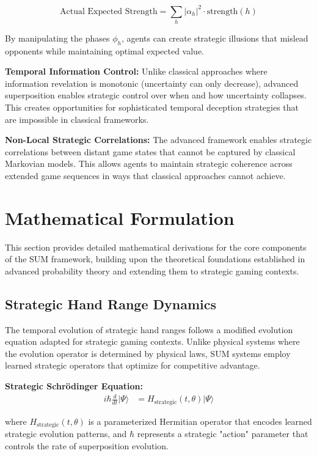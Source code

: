 \documentclass[11pt,a4paper]{article}
\begin{document}
\begin{equation}
\text{Actual Expected Strength} = \sum_{h} |\alpha_h|^2 \cdot \text{strength}(h)
\end{equation}

By manipulating the phases $\phi_h$, agents can create strategic illusions that mislead opponents while maintaining optimal expected value.

\textbf{Temporal Information Control:} Unlike classical approaches where information revelation is monotonic (uncertainty can only decrease), advanced superposition enables strategic control over when and how uncertainty collapses. This creates opportunities for sophisticated temporal deception strategies that are impossible in classical frameworks.

\textbf{Non-Local Strategic Correlations:} The advanced framework enables strategic correlations between distant game states that cannot be captured by classical Markovian models. This allows agents to maintain strategic coherence across extended game sequences in ways that classical approaches cannot achieve.

\section{Mathematical Formulation}

This section provides detailed mathematical derivations for the core components of the SUM framework, building upon the theoretical foundations established in advanced probability theory and extending them to strategic gaming contexts.

\subsection{Strategic Hand Range Dynamics}

The temporal evolution of strategic hand ranges follows a modified evolution equation adapted for strategic gaming contexts. Unlike physical systems where the evolution operator is determined by physical laws, SUM systems employ learned strategic operators that optimize for competitive advantage.

\textbf{Strategic Schrödinger Equation:}
\begin{align}
i\hbar \frac{d}{dt}|\Psi\rangle &= H_{\text{strategic}}(t, \theta) |\Psi\rangle
\end{align}

where $H_{\text{strategic}}(t, \theta)$ is a parameterized Hermitian operator that encodes learned strategic evolution patterns, and $\hbar$ represents a strategic "action" parameter that controls the rate of superposition evolution.
\end{document}
